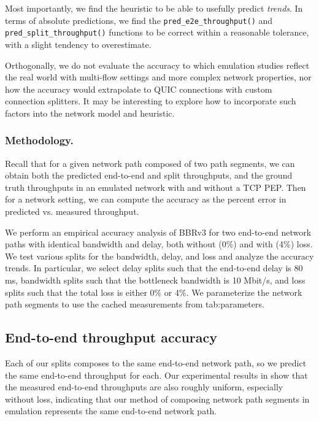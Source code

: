 \noindent Most importantly, we find the heuristic to be able to usefully
 predict \textit{trends}.
 In terms of absolute predictions, we find the \texttt{pred\_e2e\_throughput()}
 and \texttt{pred\_split\_throughput()} functions to be correct within a
 reasonable tolerance, with a slight tendency to overestimate.

Orthogonally, we do not evaluate the accuracy to which emulation studies reflect
the real world with multi-flow settings and more complex network properties,
nor how the accuracy would extrapolate to QUIC connections with custom
connection splitters. It may be interesting to explore how to incorporate
such factors into the network model and heuristic.

\subsubsection{Methodology.}

Recall that for a given network path composed of two path segments, we can
obtain both the predicted end-to-end and split throughputs, and the ground
truth throughputs in an emulated network with and without a TCP PEP. Then for a
network setting, we can compute the accuracy as the percent error in predicted
vs. measured throughput.

We perform an empirical accuracy analysis of BBRv3 for two end-to-end network paths with
identical bandwidth and delay, both without (0\%) and with (4\%) loss. We test
various splits for the bandwidth, delay, and loss and analyze the accuracy
trends. In particular, we select delay splits such that the end-to-end delay is
80 ms, bandwidth splits such that the bottleneck bandwidth is 10 Mbit/s, and loss
splits such that the total loss is either 0\% or 4\%. We parameterize the network
path segments to use the cached measurements from \Cref
{tab:parameters}.

\subsection{End-to-end throughput accuracy}
\label{sec:splitting:accuracy:e2e}

Each of our splits composes to the same end-to-end network path, so we predict
the same end-to-end throughput for each. Our experimental
results in  show that the measured end-to-end
throughputs are also roughly uniform, especially without loss, indicating that
our method of composing network path segments in emulation represents the same
end-to-end network path.

